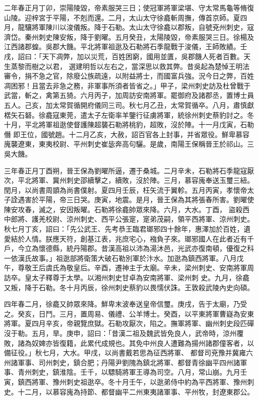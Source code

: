 \begin{pinyinscope}
 二年春正月丁卯，崇陽陵毀，帝素服哭三日；使冠軍將軍梁堪、守太常馬龜等脩復山陵。迎梓宮于平陽，不剋而還。二月，太山太守徐龕斬周撫，傳首京師。夏四月，龍驤將軍陳川以浚儀叛。降于石勒。太山太守徐龕以郡叛，自號兗州刺史，寇濟岱。秦州刺史陳安叛，降于劉曜。五月癸丑，太陽陵毀，帝素服哭三日。徐楊及江西諸郡蝗。吳郡大饑。平北將軍祖逖及石勒將石季龍戰于浚儀，王師敗績。壬戌，詔曰：「天下凋弊，加以災荒，百姓困窮，國用並匱，吳郡饑人死者百數。天生蒸黎而樹之以君，
 選建明哲以左右之，當深思以救其弊。昔吳起為楚悼王明法審令，捐不急之官，除廢公族疏遠，以附益將士，而國富兵強。況今日之弊，百姓凋困邪！且當去非急之務，非軍事所須者皆省之。」甲子，梁州刺史訪及杜曾戰于武當，斬之，禽第五猗。六月丙子，加周訪安南將軍。罷御府及諸郡丞，置博士員五人。己亥，加太常賀循開府儀同三司。秋七月乙丑，太常賀循卒。八月，肅慎獻楛矢石砮。徐龕寇東莞，遣太子左衛率羊鑒行征虜將軍，統徐州刺史蔡豹討之。冬十月，平北將軍祖逖使督護陳超襲石勒將桃豹，超敗，沒於陣。十一月戊寅，石勒僭
 即王位，國號趙。十二月乙亥，大赦，詔百官各上封事，并省眾役。鮮卑慕容廆襲遼東，東夷校尉、平州刺史崔毖奔高句驪。是歲，南陽王保稱晉王於祁山。三吳大饑。



 三年春正月丁酉朔，晉王保為劉曜所逼，遷于桑城。二月辛未，石勒將石季龍寇厭次，平北將軍、冀州刺史邵續擊之，續敗，沒於陣。三月，慕容廆奉送玉璽三紐。閏月，以尚書周顗為尚書僕射。夏四月壬辰，枉矢流于翼軫。五月丙寅，孝懷帝太子詮遇害於平陽，帝三日哭。庚寅，地震。是月，晉王保為其將張春所害。劉曜使陳安攻春，滅之，安因叛曜。石勒將徐龕帥眾來降。六月，大水。丁酉，
 盜殺西中郎將、護羌校尉、涼州刺史、西平公張寔，寔弟茂嗣，領平西將軍、涼州刺史。秋七月丁亥，詔曰：「先公武王、先考恭王臨君瑯邪四十餘年，惠澤加於百姓，遺愛結於人情。朕應天符，創基江表，兆庶宅心，襁負子來。瑯邪國人在此者近有千戶，今立為懷德縣，統丹陽郡。昔漢高祖以沛為湯沐邑，光武亦復南頓，優復之科一依漢氏故事。」祖逖部將衛策大破石勒別軍於汴水。加逖為鎮西將軍。八月戊午，尊敬王后虞氏為敬皇后。辛酉，遷神主于太廟。辛未，梁州刺史、安南將軍周訪卒。皇太子釋尊于太學。以湘州刺史甘卓為安南將軍、梁州刺
 史。九月，徐龕又叛，降于石勒。冬十月丙辰，徐州刺史蔡豹以畏懦伏誅。王敦殺武陵內史向碩。



 四年春二月，徐龕又帥眾來降。鮮卑末波奉送皇帝信璽。庚戌，告于太廟，乃受之。癸亥，日鬥。三月，置周易、儀禮、公羊博士。癸酉，以平東將軍曹嶷為安東將軍。夏四月辛亥，帝親覽庶獄。石勒攻厭次，陷之。撫軍將軍、幽州刺史段匹磾沒于勒。五月，旱。庚申，詔曰：「昔漢二祖及魏武皆免良人，武帝時，涼州覆敗，諸為奴婢亦皆復籍，此累代成規也。其免中州良人遭難為揚州諸郡僮客者，以備征役。」秋七月，大水。甲戌，以尚書戴若思為征西將軍、
 都督司兗豫并冀雍六州諸軍事、司州刺史，鎮合肥；丹陽尹劉隗為鎮北將軍、都督青徐幽平四州諸軍事、青州刺史，鎮淮陰。壬千，以驃騎將軍王導為司空。八月，常山崩。九月壬寅，鎮西將軍、豫州刺史祖逖卒。冬十月壬午，以逖弟侍中約為平西將軍、豫州刺史。十二月，以慕容廆為持節、都督幽平二州東夷諸軍事、平州牧，封遼東郡公。




\end{pinyinscope}
